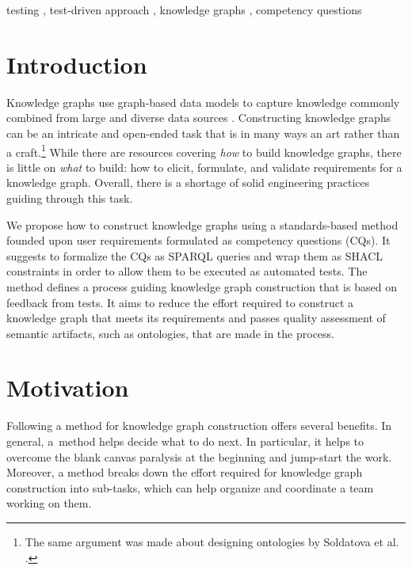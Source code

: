 \documentclass[
]{ceurart}
\begin{document}
\begin{keywords}
  testing \sep
  test-driven approach \sep
  knowledge graphs \sep
  competency questions
\end{keywords}

\maketitle

\section{Introduction}
Knowledge graphs use graph-based data models to capture knowledge commonly combined from large and diverse data sources \cite{Hogan2021}. Constructing knowledge graphs can be an intricate and open-ended task that is in many ways an art rather than a craft.\footnote{The same argument was made about designing ontologies by Soldatova et al. \cite{Soldatova2016}.} While there are resources covering \textit{how} to build knowledge graphs, there is little on \textit{what} to build: how to elicit, formulate, and validate requirements for a knowledge graph. Overall, there is a shortage of solid engineering practices guiding through this task.

We propose how to construct knowledge graphs using a standards-based method founded upon user requirements formulated as competency questions (CQs). It suggests to formalize the CQs as SPARQL queries \cite{SPARQL2013} and wrap them as SHACL constraints \cite{SHACL2017} in order to allow them to be executed as automated tests. The method defines a process guiding knowledge graph construction that is based on feedback from tests. It aims to reduce the effort required to construct a knowledge graph that meets its requirements and passes quality assessment of semantic artifacts, such as ontologies, that are made in the process.

\section{Motivation}
Following a method for knowledge graph construction offers several benefits. In general, a~method helps decide what to do next. In particular, it helps to overcome the blank canvas paralysis at the beginning and jump-start the work. Moreover, a method breaks down the effort required for knowledge graph construction into sub-tasks, which can help organize and coordinate a team working on them.
\end{document}
